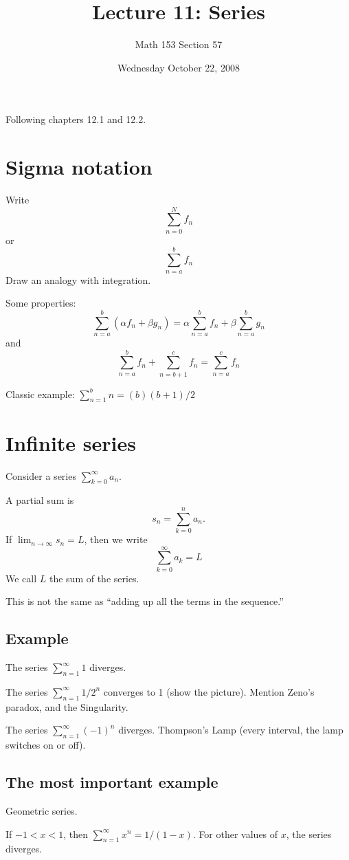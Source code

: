 \documentclass[12pt]{article}
\title{Lecture 11: Series}
\author{Math 153 Section 57}
\date{Wednesday October 22, 2008}
\begin{document}
\maketitle

Following chapters 12.1 and 12.2.

\section*{Sigma notation}

Write
$$
\sum_{n=0}^N f_n
$$
or
$$
\sum_{n=a}^b f_n
$$
Draw an analogy with integration.

Some properties:
$$
\sum_{n=a}^b (\alpha f_n + \beta g_n) = \alpha \sum_{n=a}^b f_n + \beta \sum_{n=a}^b g_n
$$
and
$$
\sum_{n=a}^b f_n + \sum_{n=b+1}^c f_n = \sum_{n=a}^c f_n
$$

Classic example: $\sum_{n=1}^b n = (b)(b+1)/2$

\section*{Infinite series}

Consider a series $\sum_{k=0}^\infty a_n$.

A partial sum is
$$
s_n = \sum_{k=0}^n a_n.
$$
If $\lim_{n \to \infty} s_n = L$, then we write
$$
\sum_{k=0}^\infty a_k = L
$$
We call $L$ the sum of the series.

This is not the same as ``adding up all the terms in the sequence.''

\subsection*{Example}

The series $\sum_{n=1}^\infty 1$ diverges.

The series $\sum_{n=1}^\infty 1/2^n$ converges to 1 (show the
picture).  Mention Zeno's paradox, and the Singularity.

The series $\sum_{n=1}^\infty (-1)^n$ diverges.  Thompson's Lamp
(every interval, the lamp switches on or off).

\subsection*{The most important example}

Geometric series.

If $-1 < x < 1$, then $\sum_{n=1}^\infty x^n = 1/(1-x)$.  For other values of $x$, the series diverges.
\end{document}

